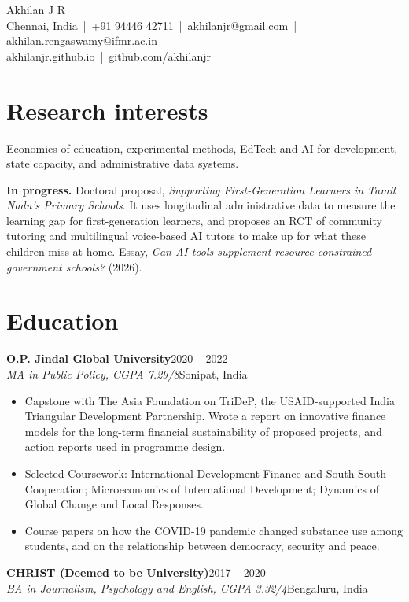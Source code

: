\documentclass[11pt,a4paper]{article}
\newcommand{\entry}[4]{\noindent\textbf{#1}\hfill #2\\ \textit{#3}\hfill #4\par}
\begin{document}
\begin{center}
{\LARGE Akhilan J R}\\[4pt]
Chennai, India \,|\, +91 94446 42711 \,|\, akhilanjr@gmail.com \,|\, akhilan.rengaswamy@ifmr.ac.in\\ akhilanjr.github.io \,|\, github.com/akhilanjr
\end{center}

\section{Research interests}
Economics of education, experimental methods, EdTech and AI for development, state capacity, and administrative data systems.

\vspace{4pt}
\textbf{In progress.} Doctoral proposal, \textit{Supporting First-Generation Learners in Tamil Nadu's Primary Schools}. It uses longitudinal administrative data to measure the learning gap for first-generation learners, and proposes an RCT of community tutoring and multilingual voice-based AI tutors to make up for what these children miss at home. Essay, \textit{Can AI tools supplement resource-constrained government schools?} (2026).

\section{Education}
\entry{O.P. Jindal Global University}{2020 -- 2022}{MA in Public Policy, CGPA 7.29/8}{Sonipat, India}
\begin{itemize}
  \item Capstone with The Asia Foundation on TriDeP, the USAID-supported India Triangular Development Partnership. Wrote a report on innovative finance models for the long-term financial sustainability of proposed projects, and action reports used in programme design.
  \item Selected Coursework: International Development Finance and South-South Cooperation; Microeconomics of International Development; Dynamics of Global Change and Local Responses.
  \item Course papers on how the COVID-19 pandemic changed substance use among students, and on the relationship between democracy, security and peace.
\end{itemize}

\vspace{4pt}
\entry{CHRIST (Deemed to be University)}{2017 -- 2020}{BA in Journalism, Psychology and English, CGPA 3.32/4}{Bengaluru, India}
\end{document}
